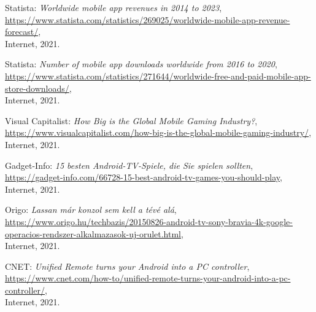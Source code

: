 \begin{thebibliography}{x}
	Statista: \emph{Worldwide mobile app revenues in 2014 to 2023}, \\
	\url{https://www.statista.com/statistics/269025/worldwide-mobile-app-revenue-forecast/}, \\
	Internet, 2021.
	
	Statista: \emph{Number of mobile app downloads worldwide from 2016 to 2020}, \\
	\url{https://www.statista.com/statistics/271644/worldwide-free-and-paid-mobile-app-store-downloads/}, \\
	Internet, 2021.
	
	Visual Capitalist: \emph{How Big is the Global Mobile Gaming Industry?}, \\
	\url{https://www.visualcapitalist.com/how-big-is-the-global-mobile-gaming-industry/}, \\
	Internet, 2021.
	
	Gadget-Info: \emph{15 besten Android-TV-Spiele, die Sie spielen sollten}, \\
	\url{https://gadget-info.com/66728-15-best-android-tv-games-you-should-play}, \\
	Internet, 2021.
	
	Origo: \emph{Lassan már konzol sem kell a tévé alá}, \\
	\url{https://www.origo.hu/techbazis/20150826-android-tv-sony-bravia-4k-google-operacios-rendszer-alkalmazasok-uj-orulet.html}, \\
	Internet, 2021.
	
	CNET: \emph{Unified Remote turns your Android into a PC controller}, \\
	\url{https://www.cnet.com/how-to/unified-remote-turns-your-android-into-a-pc-controller/}, \\
	Internet, 2021.
	
	
	

\end{thebibliography}
